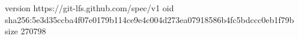 version https://git-lfs.github.com/spec/v1
oid sha256:5e3d35ccba4f07e0179b114ce9e4c004d273ea07918586b4fc5bdccc0eb1f79b
size 270798
